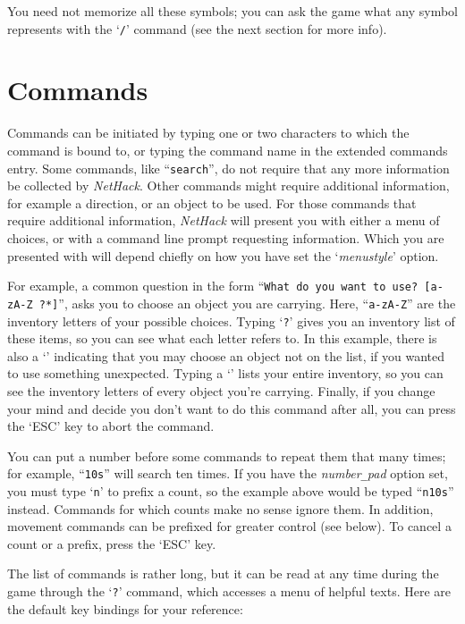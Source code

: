 \elist
You need not memorize all these symbols; you can ask the game what any
symbol represents with the `{\tt /}' command (see the next section for
more info).

\section{Commands}

Commands can be initiated by typing one or two characters to which
the command is bound to, or typing the command name in the extended
commands entry.  Some commands,
like ``{\tt search}'', do not require that any more information be collected
by {\it NetHack\/}.  Other commands might require additional information, for
example a direction, or an object to be used.  For those commands that
require additional information, {\it NetHack\/} will present you with either
a menu of choices, or with a command line prompt requesting information.
Which you are presented with will depend chiefly on how you have set the
`{\it menustyle\/}'
option.

For example, a common question in the form ``{\tt What do you want to
use? [a-zA-Z\ ?*]}'', asks you to choose an object you are carrying.
Here, ``{\tt a-zA-Z}'' are the inventory letters of your possible choices.
Typing `{\tt ?}' gives you an inventory list of these items, so you can see
what each letter refers to.  In this example, there is also a `{\tt *}'
indicating that you may choose an object not on the list, if you
wanted to use something unexpected.  Typing a `{\tt *}' lists your entire
inventory, so you can see the inventory letters of every object you're
carrying.  Finally, if you change your mind and decide you don't want
to do this command after all, you can press the `ESC' key to abort the
command.

You can put a number before some commands to repeat them that many
times; for example, ``{\tt 10s}'' will search ten times.  If you have the
{\it number\verb+_+pad\/}
option set, you must type `{\tt n}' to prefix a count, so the example above
would be typed ``{\tt n10s}'' instead.  Commands for which counts make no
sense ignore them.  In addition, movement commands can be prefixed for
greater control (see below).  To cancel a count or a prefix, press the
`ESC' key.

The list of commands is rather long, but it can be read at any time
during the game through the `{\tt ?}' command, which accesses a menu of
helpful texts.  Here are the default key bindings for your reference:

